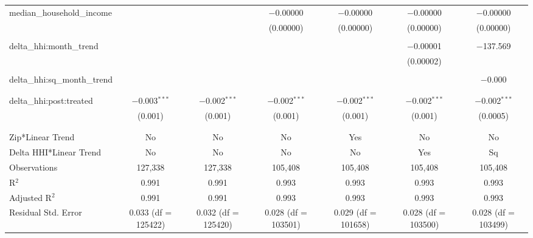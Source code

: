 \begin{table}[H]
{\begin{tabular}{@{\extracolsep{5pt}}lcccccc}
  median\_household\_income &  &  & $-$0.00000 & $-$0.00000 & $-$0.00000 & $-$0.00000 \\  

   &  &  & (0.00000) & (0.00000) & (0.00000) & (0.00000) \\  

   & & & & & & \\  

  delta\_hhi:month\_trend &  &  &  &  & $-$0.00001 & $-$137.569 \\  

   &  &  &  &  & (0.00002) &  \\  

   & & & & & & \\  

  delta\_hhi:sq\_month\_trend &  &  &  &  &  & $-$0.000 \\  

   &  &  &  &  &  &  \\  

   & & & & & & \\  

  delta\_hhi:post:treated & $-$0.003$^{***}$ & $-$0.002$^{***}$ & $-$0.002$^{***}$ & $-$0.002$^{***}$ & $-$0.002$^{***}$ & $-$0.002$^{***}$ \\  

   & (0.001) & (0.001) & (0.001) & (0.001) & (0.001) & (0.0005) \\  

   & & & & & & \\  

 \hline \\[-1.8ex]  

 Zip*Linear Trend & No & No & No & Yes & No & No \\  

 Delta HHI*Linear Trend & No & No & No & No & Yes & Sq \\  

 Observations & 127,338 & 127,338 & 105,408 & 105,408 & 105,408 & 105,408 \\  

 R$^{2}$ & 0.991 & 0.991 & 0.993 & 0.993 & 0.993 & 0.993 \\  

 Adjusted R$^{2}$ & 0.991 & 0.991 & 0.993 & 0.993 & 0.993 & 0.993 \\  

 Residual Std. Error & 0.033 (df = 125422) & 0.032 (df = 125420) & 0.028 (df = 103501) & 0.029 (df = 101658) & 0.028 (df = 103500) & 0.028 (df = 103499) \\  


\end{tabular}}
\end{table}
